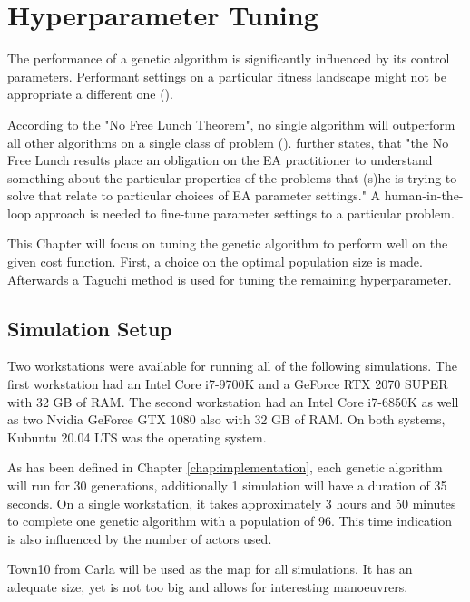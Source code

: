 \chapter{Hyperparameter Tuning}
\label{chap:hyperparameter_tuning}
The performance of a genetic algorithm is significantly influenced by its control parameters. Performant settings on a particular fitness landscape might not be appropriate a different one (\cite{kacprzyk_parameter_2007}).

According to the "No Free Lunch Theorem", no single algorithm will outperform all other algorithms on a single class of problem (\cite{kacprzyk_parameter_2007}). \cite{kacprzyk_parameter_2007} further states, that "the No Free Lunch results place an obligation on the EA practitioner to understand something about the particular properties of the problems that (s)he is trying to solve that relate to particular choices of EA parameter settings."
A human-in-the-loop approach is needed to fine-tune parameter settings to a particular problem.

This Chapter will focus on tuning the genetic algorithm to perform well on the given cost function. First, a choice on the optimal population size is made. Afterwards a Taguchi method is used for tuning the remaining hyperparameter.

\section{Simulation Setup}
\label{chap:hyperparameter_tuning:simulation_setup}
Two workstations were available for running all of the following simulations. The first workstation had an Intel Core i7-9700K and a GeForce RTX 2070 SUPER with 32 GB of RAM. The second workstation had an Intel Core i7-6850K as well as two Nvidia GeForce GTX 1080 also with 32 GB of RAM. On both systems, Kubuntu 20.04 LTS was the operating system.

As has been defined in Chapter \ref{chap:implementation}, each genetic algorithm will run for 30 generations, additionally 1 simulation will have a duration of 35 seconds. On a single workstation, it takes approximately 3 hours and 50 minutes to complete one genetic algorithm with a population of 96. This time indication is also influenced by the number of actors used. 

Town10 from Carla will be used as the map for all simulations. It has an adequate size, yet is not too big and allows for interesting manoeuvrers.

